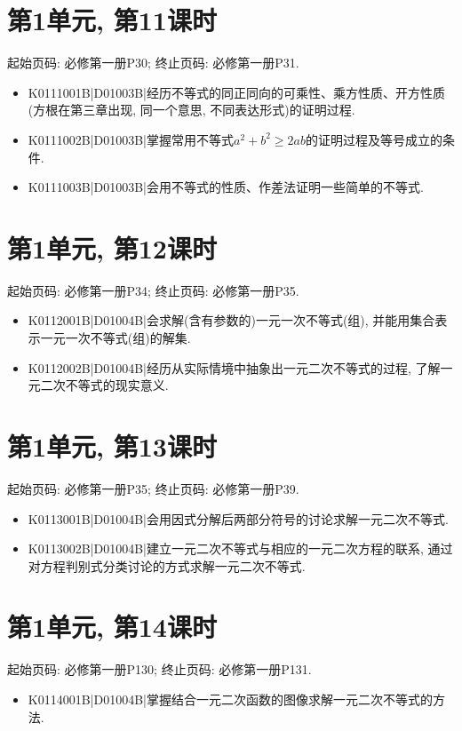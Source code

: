 \section*{第1单元, 第11课时}
起始页码: 必修第一册P30; 终止页码: 必修第一册P31.
\begin{itemize}
\item K0111001B|D01003B|经历不等式的同正同向的可乘性、乘方性质、开方性质(方根在第三章出现, 同一个意思, 不同表达形式)的证明过程.
\item K0111002B|D01003B|掌握常用不等式$a^2+b^2 \ge 2ab$的证明过程及等号成立的条件.
\item K0111003B|D01003B|会用不等式的性质、作差法证明一些简单的不等式.
\end{itemize}

\section*{第1单元, 第12课时}
起始页码: 必修第一册P34; 终止页码: 必修第一册P35.
\begin{itemize}
\item K0112001B|D01004B|会求解(含有参数的)一元一次不等式(组), 并能用集合表示一元一次不等式(组)的解集.
\item K0112002B|D01004B|经历从实际情境中抽象出一元二次不等式的过程, 了解一元二次不等式的现实意义.
\end{itemize}

\section*{第1单元, 第13课时}
起始页码: 必修第一册P35; 终止页码: 必修第一册P39.
\begin{itemize}
\item K0113001B|D01004B|会用因式分解后两部分符号的讨论求解一元二次不等式.
\item K0113002B|D01004B|建立一元二次不等式与相应的一元二次方程的联系, 通过对方程判别式分类讨论的方式求解一元二次不等式.
\end{itemize}

\section*{第1单元, 第14课时}
起始页码: 必修第一册P130; 终止页码: 必修第一册P131.
\begin{itemize}
\item K0114001B|D01004B|掌握结合一元二次函数的图像求解一元二次不等式的方法.
\end{itemize}

